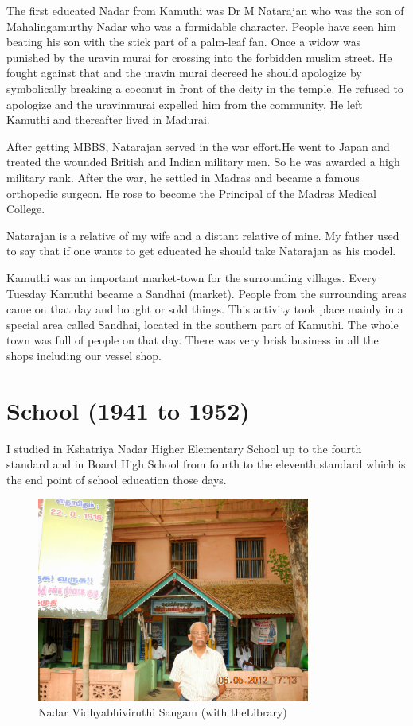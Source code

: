 The first educated Nadar from Kamuthi was Dr M Natarajan who was the son 
of Mahalingamurthy Nadar who was a formi\-dable character. People have 
seen him beating his son with the stick part of a palm-leaf fan. Once a 
widow was punished by the uravin murai for crossing into the forbidden 
muslim street. He fought against that and the uravin murai decreed he 
should apologize by symbolically breaking a coconut in front of the\break 
deity in the temple. He refused to apologize and the uravin\break murai 
expelled him from the community. He left Kamuthi and thereafter lived in 
Madurai.

After getting MBBS, Natarajan served in the war effort.\break He went to Japan 
and treated the wounded British and Indian mili\-tary men. So he was 
awarded a high military rank. After the war, he settled in Madras and 
became a famous orthopedic surgeon. He rose to become the Principal of 
the Madras Medical College.

Natarajan is a relative of my wife and a distant relative of mine. My 
father used to say that if one wants to get educated he should take 
Natarajan as his model.

Kamuthi was an important market-town for the surroun\-ding villages. Every 
Tuesday Kamuthi became a Sandhai (market). People from the surrounding 
areas came on that day and bought or sold things. This activity took 
place mainly in a special area called Sandhai, located in the southern 
part of Kamuthi. The whole town was full of people on that day. There 
was very brisk business in all the shops including our vessel shop.

\section*{School (1941 to 1952)}

I studied in Kshatriya Nadar Higher Elementary School up to the fourth
standard and in Board High School from fourth to the eleventh standard
which is the end point of school education those days.

\vspace{-\topsep}
\begin{figure}[H]
\centering
\includegraphics[width=0.8\textwidth]{images/new-images/03-Rajaji-lib.jpg}
\caption{\small{Nadar Vidhyabhiviruthi Sangam (with the\break Library)}}
\end{figure}
\vspace{-\topsep}

